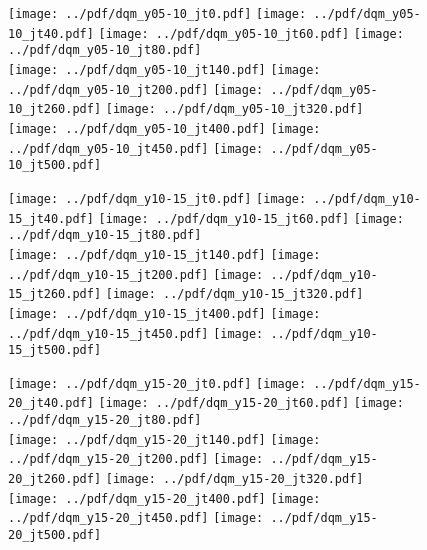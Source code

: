 \documentclass[landscape,10pt]{beamer} %
\begin{document}
\newpage

\begin{figure}[p]
\texttt{[image: ../pdf/dqm\_y05-10\_jt0.pdf]}
\texttt{[image: ../pdf/dqm\_y05-10\_jt40.pdf]}
\texttt{[image: ../pdf/dqm\_y05-10\_jt60.pdf]}
\texttt{[image: ../pdf/dqm\_y05-10\_jt80.pdf]}\\
\texttt{[image: ../pdf/dqm\_y05-10\_jt140.pdf]}
\texttt{[image: ../pdf/dqm\_y05-10\_jt200.pdf]}
\texttt{[image: ../pdf/dqm\_y05-10\_jt260.pdf]}
\texttt{[image: ../pdf/dqm\_y05-10\_jt320.pdf]}\\
\texttt{[image: ../pdf/dqm\_y05-10\_jt400.pdf]}
\texttt{[image: ../pdf/dqm\_y05-10\_jt450.pdf]}
\texttt{[image: ../pdf/dqm\_y05-10\_jt500.pdf]}
\end{figure}

\newpage

\begin{figure}[p]
\texttt{[image: ../pdf/dqm\_y10-15\_jt0.pdf]}
\texttt{[image: ../pdf/dqm\_y10-15\_jt40.pdf]}
\texttt{[image: ../pdf/dqm\_y10-15\_jt60.pdf]}
\texttt{[image: ../pdf/dqm\_y10-15\_jt80.pdf]}\\
\texttt{[image: ../pdf/dqm\_y10-15\_jt140.pdf]}
\texttt{[image: ../pdf/dqm\_y10-15\_jt200.pdf]}
\texttt{[image: ../pdf/dqm\_y10-15\_jt260.pdf]}
\texttt{[image: ../pdf/dqm\_y10-15\_jt320.pdf]}\\
\texttt{[image: ../pdf/dqm\_y10-15\_jt400.pdf]}
\texttt{[image: ../pdf/dqm\_y10-15\_jt450.pdf]}
\texttt{[image: ../pdf/dqm\_y10-15\_jt500.pdf]}
\end{figure}

\newpage

\begin{figure}[p]
\texttt{[image: ../pdf/dqm\_y15-20\_jt0.pdf]}
\texttt{[image: ../pdf/dqm\_y15-20\_jt40.pdf]}
\texttt{[image: ../pdf/dqm\_y15-20\_jt60.pdf]}
\texttt{[image: ../pdf/dqm\_y15-20\_jt80.pdf]}\\
\texttt{[image: ../pdf/dqm\_y15-20\_jt140.pdf]}
\texttt{[image: ../pdf/dqm\_y15-20\_jt200.pdf]}
\texttt{[image: ../pdf/dqm\_y15-20\_jt260.pdf]}
\texttt{[image: ../pdf/dqm\_y15-20\_jt320.pdf]}\\
\texttt{[image: ../pdf/dqm\_y15-20\_jt400.pdf]}
\texttt{[image: ../pdf/dqm\_y15-20\_jt450.pdf]}
\texttt{[image: ../pdf/dqm\_y15-20\_jt500.pdf]}
\end{figure}
\end{document}

